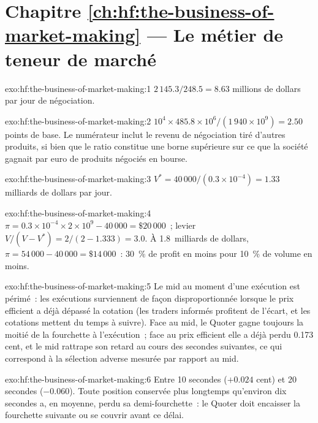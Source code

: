 \section*{Chapitre \ref{ch:hf:the-business-of-market-making} --- Le métier de teneur de marché}

\begin{solution}{exo:hf:the-business-of-market-making:1}
$2\,145.3/248.5=8.63$ millions de dollars par jour de négociation.
\end{solution}

\begin{solution}{exo:hf:the-business-of-market-making:2}
$10^4\times485.8\times10^6/(1\,940\times10^9)=2.50$ points de base. Le numérateur inclut le revenu de négociation tiré d'autres produits, si bien que le ratio constitue une
borne supérieure sur ce que la société gagnait par euro de produits négociés en bourse.
\end{solution}

\begin{solution}{exo:hf:the-business-of-market-making:3}
$V^\ast=40\,000/(0.3\times10^{-4})=1.33$ milliards de dollars par jour.
\end{solution}

\begin{solution}{exo:hf:the-business-of-market-making:4}
$\pi=0.3\times10^{-4}\times2\times10^9-40\,000=\$20\,000$~; levier $V/(V-V^\ast)=2/(2-1.333)=3.0$. À 1.8~milliards de dollars, $\pi=54\,000-40\,000=
\$14\,000$~: 30~\% de profit en moins pour 10~\% de volume en moins.
\end{solution}

\begin{solution}{exo:hf:the-business-of-market-making:5}
Le mid au moment d'une exécution est périmé~: les exécutions surviennent de façon disproportionnée lorsque le prix efficient a déjà dépassé la cotation (les
traders informés profitent de l'écart, et les cotations mettent du temps à suivre). Face au mid, le Quoter gagne toujours la moitié de la fourchette à l'exécution~; face au prix efficient
elle a déjà perdu 0.173 cent, et le mid rattrape son retard au cours des secondes suivantes, ce qui correspond à la sélection adverse mesurée par rapport au mid.
\end{solution}

\begin{solution}{exo:hf:the-business-of-market-making:6}
Entre 10 secondes ($+0.024$ cent) et 20 secondes ($-0.060$). Toute position conservée plus longtemps qu'environ dix secondes a, en moyenne, perdu sa demi-fourchette~:
le Quoter doit encaisser la fourchette suivante ou se couvrir avant ce délai.
\end{solution}

